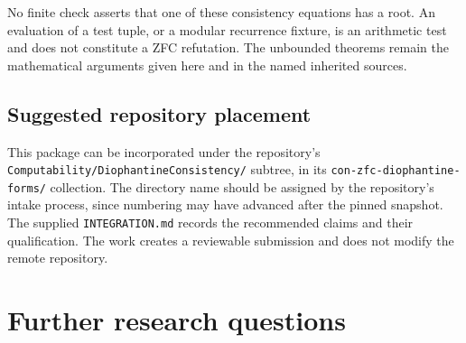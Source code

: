 \documentclass[10pt,letterpaper]{article}
\theoremstyle{remark}\newtheorem{remark}[theorem]{Remark}
\newcommand{\pathtext}[1]{\nolinkurl{#1}}
\begin{document}
No finite check asserts that one of these consistency equations has a
root. An evaluation of a test tuple, or a modular recurrence fixture, is
an arithmetic test and does not constitute a ZFC refutation. The
unbounded theorems remain the mathematical arguments given here and in
the named inherited sources.

\subsection{Suggested repository placement}

This package can be incorporated under the repository's
\pathtext{Computability/DiophantineConsistency/} subtree, in its
\pathtext{con-zfc-diophantine-forms/} collection.
The directory name should be assigned by the repository's intake process,
since numbering may have advanced after the pinned snapshot. The supplied
\pathtext{INTEGRATION.md} records the recommended claims and their
qualification. The work creates a reviewable submission and does not
modify the remote repository.

\section{Further research questions}
\end{document}
